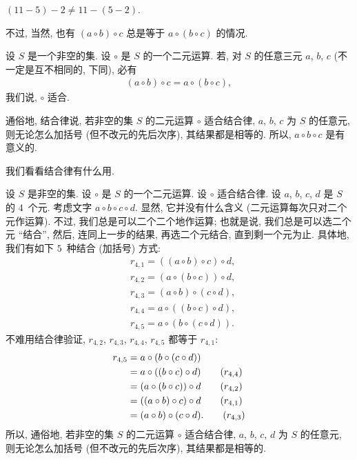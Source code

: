 \documentclass[%
    UTF8,%
    fontset=none,%
    punct=kaiming,%
    zihao=-4,%
    a4paper,%
    oneside,%
]{ctexbook}
\let\emph\relax
\begin{document}
\begin{example}
    \(
    (11 - 5) - 2 \neq 11 - (5 - 2).
    \)
\end{example}

不过, 当然, 也有 \((a \circ b) \circ c\)
总是等于 \(a \circ (b \circ c)\)
的情况.

\begin{definition}
    设 \(S\) 是一个非空的集.
    设 \(\circ\) 是 \(S\) 的一个二元运算.
    若, 对 \(S\) 的任意三元 \(a\), \(b\), \(c\)
    (不一定是互不相同的, 下同),
    必有
    \begin{align*}
        (a \circ b) \circ c = a \circ (b \circ c),
    \end{align*}
    我们说, \(\circ\) 适合\emph{结合律}.
\end{definition}

通俗地, 结合律说,
若非空的集 \(S\) 的二元运算 \(\circ\) 适合结合律,
\(a\), \(b\), \(c\) 为 \(S\) 的任意\emph{三}元,
则无论怎么加括号
(但不改元的先后次序),
其结果都是相等的.
所以, \(a \circ b \circ c\) 是有意义的.

我们看看结合律有什么用.

设 \(S\) 是非空的集.
设 \(\circ\) 是 \(S\) 的一个二元运算.
设 \(\circ\) 适合结合律.
设 \(a\), \(b\), \(c\), \(d\) 是 \(S\) 的 \(4\)~个元.
考虑文字 \(a \circ b \circ c \circ d\).
显然, 它并没有什么含义
(二元运算每次只对二个元作运算).
不过, 我们总是可以二个二个地作运算;
也就是说, 我们总是可以选二个元 ``结合'',
然后, 连同上一步的结果, 再选二个元结合,
直到剩一个元为止.
具体地, 我们有如下 \(5\)~种结合 (加括号) 方式:
\begin{align*}
     & r_{4,1} = ((a \circ b) \circ c) \circ d, \\
     & r_{4,2} = (a \circ (b \circ c)) \circ d, \\
     & r_{4,3} = (a \circ b) \circ (c \circ d), \\
     & r_{4,4} = a \circ ((b \circ c) \circ d), \\
     & r_{4,5} = a \circ (b \circ (c \circ d)).
\end{align*}
不难用结合律验证,
\(r_{4,2}\), \(r_{4,3}\), \(r_{4,4}\), \(r_{4,5}\)
都等于 \(r_{4,1}\):
\begin{align*}
    r_{4,5}
    = {} & a \circ (b \circ (c \circ d))
    \\
    = {} & a \circ ((b \circ c) \circ d)
    \tag*{(\(r_{4,4}\))}                  \\
    = {} & (a \circ (b \circ c)) \circ d
    \tag*{(\(r_{4,2}\))}                  \\
    = {} & ((a \circ b) \circ c) \circ d
    \tag*{(\(r_{4,1}\))}                  \\
    = {} & (a \circ b) \circ (c \circ d).
    \tag*{(\(r_{4,3}\))}
\end{align*}
所以, 通俗地,
若非空的集 \(S\) 的二元运算 \(\circ\) 适合结合律,
\(a\), \(b\), \(c\), \(d\) 为 \(S\) 的任意\emph{四}元,
则无论怎么加括号
(但不改元的先后次序),
其结果都是相等的.
\end{document}
